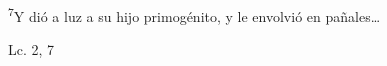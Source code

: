 \documentclass[../../rosario.tex]{subfiles}
\begin{document}
    \textsuperscript{7}Y dió a luz a su hijo primogénito, y le envolvió en pañales\ldots
    \begin{flushright}
    Lc. 2, 7          
    \end{flushright}
\end{document}
